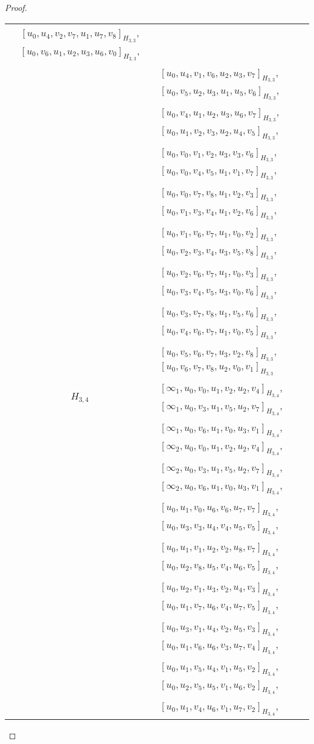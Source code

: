 \begin{subappendices}
\begin{proof}
{\begin{longtable}{|c|l|}
  $[u_0, u_4, v_2, v_7, u_1, u_7, v_8]_{H_{3,3}}$,
  $[u_0, v_6, u_1, u_2, u_3, u_6, v_0]_{H_{3,3}}$, \\* &
  $[u_0, u_4, v_1, v_6, u_2, u_3, v_7]_{H_{3,3}}$,
  $[u_0, v_5, u_2, u_3, u_1, u_5, v_6]_{H_{3,3}}$, \\* &
  $[u_0, v_4, u_1, u_2, u_3, u_6, v_7]_{H_{3,3}}$,
  $[u_0, u_1, v_2, v_3, u_2, u_4, v_5]_{H_{3,3}}$, \\* &
  $[u_0, v_0, v_1, v_2, u_3, v_3, v_6]_{H_{3,3}}$,
  $[u_0, v_0, v_4, v_5, u_1, v_1, v_7]_{H_{3,3}}$, \\* &
  $[u_0, v_0, v_7, v_8, u_1, v_2, v_3]_{H_{3,3}}$,
  $[u_0, v_1, v_3, v_4, u_1, v_2, v_6]_{H_{3,3}}$, \\* &
  $[u_0, v_1, v_6, v_7, u_1, v_0, v_2]_{H_{3,3}}$,
  $[u_0, v_2, v_3, v_4, u_3, v_5, v_8]_{H_{3,3}}$, \\* &
  $[u_0, v_2, v_6, v_7, u_1, v_0, v_3]_{H_{3,3}}$,
  $[u_0, v_3, v_4, v_5, u_3, v_0, v_6]_{H_{3,3}}$, \\* &
  $[u_0, v_3, v_7, v_8, u_1, v_5, v_6]_{H_{3,3}}$,
  $[u_0, v_4, v_6, v_7, u_1, v_0, v_5]_{H_{3,3}}$, \\* &
  $[u_0, v_5, v_6, v_7, u_3, v_2, v_8]_{H_{3,3}}$,
  $[u_0, v_6, v_7, v_8, u_2, v_0, v_1]_{H_{3,3}}$
\\ \hline
$H_{3,4}$ &
  $[\infty_1, u_0, v_0, u_1, v_2, u_2, v_4]_{H_{3,4}}$,
  $[\infty_1, u_0, v_3, u_1, v_5, u_2, v_7]_{H_{3,4}}$, \\* &
  $[\infty_1, u_0, v_6, u_1, v_0, u_3, v_1]_{H_{3,4}}$,
  $[\infty_2, u_0, v_0, u_1, v_2, u_2, v_4]_{H_{3,4}}$, \\* &
  $[\infty_2, u_0, v_3, u_1, v_5, u_2, v_7]_{H_{3,4}}$,
  $[\infty_2, u_0, v_6, u_1, v_0, u_3, v_1]_{H_{3,4}}$, \\* &
  $[u_0, u_1, v_0, u_6, v_6, u_7, v_7]_{H_{3,4}}$,
  $[u_0, u_3, v_3, u_4, v_4, u_5, v_5]_{H_{3,4}}$, \\* &
  $[u_0, u_1, v_1, u_2, v_2, u_8, v_7]_{H_{3,4}}$,
  $[u_0, u_2, v_8, u_5, v_4, u_6, v_5]_{H_{3,4}}$, \\* &
  $[u_0, u_2, v_1, u_3, v_2, u_4, v_3]_{H_{3,4}}$,
  $[u_0, u_1, v_7, u_6, v_4, u_7, v_5]_{H_{3,4}}$, \\* &
  $[u_0, u_3, v_1, u_4, v_2, u_5, v_3]_{H_{3,4}}$,
  $[u_0, u_1, v_6, u_6, v_3, u_7, v_4]_{H_{3,4}}$, \\* &
  $[u_0, u_1, v_5, u_4, v_1, u_5, v_2]_{H_{3,4}}$,
  $[u_0, u_2, v_5, u_5, v_1, u_6, v_2]_{H_{3,4}}$, \\* &
  $[u_0, u_1, v_4, u_6, v_1, u_7, v_2]_{H_{3,4}}$,

\end{longtable}}
\end{proof}
\end{subappendices}
